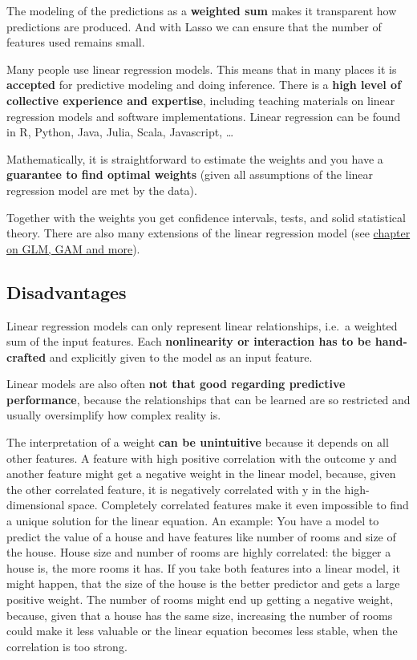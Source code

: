 \documentclass[
  12pt,
]{krantz}
\begin{document}
The modeling of the predictions as a \textbf{weighted sum} makes it transparent how predictions are produced.
And with Lasso we can ensure that the number of features used remains small.

Many people use linear regression models.
This means that in many places it is \textbf{accepted} for predictive modeling and doing inference.
There is a \textbf{high level of collective experience and expertise}, including teaching materials on linear regression models and software implementations.
Linear regression can be found in R, Python, Java, Julia, Scala, Javascript, \ldots{}

Mathematically, it is straightforward to estimate the weights and you have a \textbf{guarantee to find optimal weights} (given all assumptions of the linear regression model are met by the data).

Together with the weights you get confidence intervals, tests, and solid statistical theory.
There are also many extensions of the linear regression model (see \protect\hyperlink{extend-lm}{chapter on GLM, GAM and more}).

\hypertarget{disadvantages}{%
\subsection{Disadvantages}\label{disadvantages}}

Linear regression models can only represent linear relationships, i.e.~a weighted sum of the input features.
Each \textbf{nonlinearity or interaction has to be hand-crafted} and explicitly given to the model as an input feature.

Linear models are also often \textbf{not that good regarding predictive performance}, because the relationships that can be learned are so restricted and usually oversimplify how complex reality is.

The interpretation of a weight \textbf{can be unintuitive} because it depends on all other features.
A feature with high positive correlation with the outcome y and another feature might get a negative weight in the linear model, because, given the other correlated feature, it is negatively correlated with y in the high-dimensional space.
Completely correlated features make it even impossible to find a unique solution for the linear equation.
An example:
You have a model to predict the value of a house and have features like number of rooms and size of the house.
House size and number of rooms are highly correlated: the bigger a house is, the more rooms it has.
If you take both features into a linear model, it might happen, that the size of the house is the better predictor and gets a large positive weight.
The number of rooms might end up getting a negative weight, because, given that a house has the same size, increasing the number of rooms could make it less valuable or the linear equation becomes less stable, when the correlation is too strong.
\end{document}
